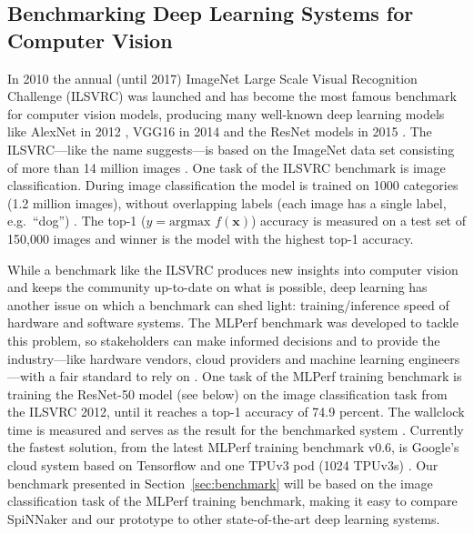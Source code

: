 \documentclass[]{article}
\begin{document}

\subsection{Benchmarking Deep Learning Systems for Computer Vision} %
\label{subsec:intro_bench}

In 2010 the annual (until 2017) ImageNet Large Scale Visual
Recognition Challenge (ILSVRC) was launched and has become the most
famous benchmark for computer vision models, producing many well-known
deep learning models like AlexNet in 2012
\citep{krizhevsky_et_al_2012}, VGG16 in 2014
\citep{simonyan_et_al_2014} and the ResNet models in 2015
\citep{he_et_al_2015}.
The ILSVRC---like the name suggests---is based on the ImageNet data
set consisting of more than 14 million images
\citep{russakovsky_et_al_2015}.
One task of the ILSVRC benchmark is image classification.
During image classification the model is trained on 1000 categories
(1.2 million images), without overlapping labels (each image has a
single label, e.g.~``dog'') \citep{russakovsky_et_al_2015}.
The top-1 ($y = \text{argmax } f(\mathbf{x})$) accuracy is measured on
a test set of 150,000 images and winner is the model with the highest
top-1 accuracy.

While a benchmark like the ILSVRC produces new insights into computer
vision and keeps the community up-to-date on what is possible,
deep learning has another issue on which a benchmark can shed light:
training/inference speed of hardware and software systems.
The MLPerf benchmark was developed to tackle this problem, so
stakeholders can make informed decisions and to provide the
industry---like hardware vendors, cloud providers and machine learning
engineers---with a fair standard to rely on
\citep{mattson_et_al_2019}.
One task of the MLPerf training benchmark is training the ResNet-50
model (see below) on the image classification task from the ILSVRC
2012, until it reaches a top-1 accuracy of 74.9 percent.
The wallclock time is measured and serves as the result for the
benchmarked system \citep{mattson_et_al_2019}.
Currently the fastest solution, from the latest MLPerf training
benchmark v0.6, is Google's cloud system based on Tensorflow and
one TPUv3 pod (1024 TPUv3s) \citep{mlperf_2019, stone_2019}.
Our benchmark presented in Section~\ref{sec:benchmark} will be based
on the image classification task of the MLPerf training benchmark,
making it easy to compare SpiNNaker and our prototype to other
state-of-the-art deep learning systems.
\end{document}
